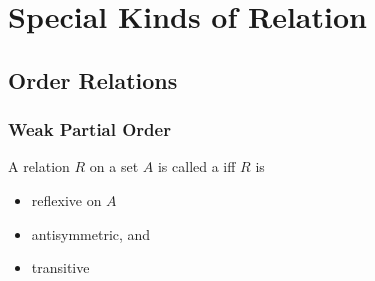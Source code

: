 \documentclass[../notes.tex]{subfiles}
\begin{document}
	\ifSubfilesClassLoaded{\setcounter{chapter}{5}}{}
	\chapter{Special Kinds of Relation}
		\section{Order Relations}
			\subsection{Weak Partial Order}
				\begin{definition}
					A relation $R$ on a set $A$ is called a  iff $R$ is
					\begin{itemize}[nosep]
						\item reflexive on $A$
						\item antisymmetric, and
						\item transitive
					\end{itemize}
				\end{definition}
\end{document}
